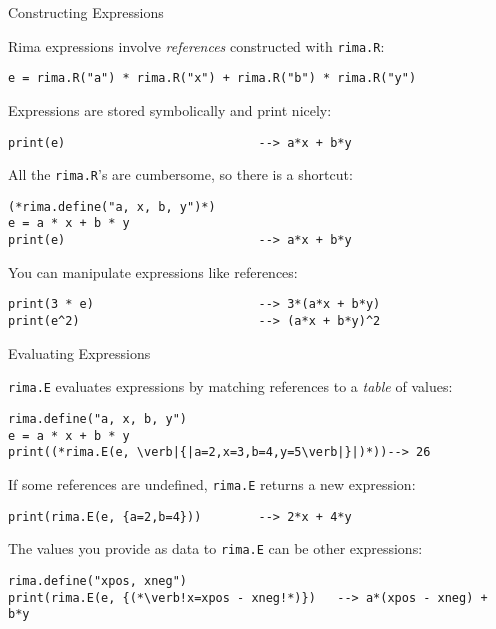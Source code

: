 \documentclass[smaller]{beamer}
\begin{document}
\begin{frame}[fragile]{Constructing Expressions}

  Rima expressions involve \emph{references} constructed with \lstinline!rima.R!:
  \begin{lstlisting}
e = rima.R("a") * rima.R("x") + rima.R("b") * rima.R("y")
  \end{lstlisting}
  \pause

  Expressions are stored symbolically and print nicely:
  \begin{lstlisting}
print(e)                           --> a*x + b*y
  \end{lstlisting}
  \pause
  

  All the \lstinline!rima.R!'s are cumbersome, so there is a shortcut:
  \begin{lstlisting}
(*rima.define("a, x, b, y")*)
e = a * x + b * y
print(e)                           --> a*x + b*y
  \end{lstlisting}
  \pause

  You can manipulate expressions like references:
  \begin{lstlisting}
print(3 * e)                       --> 3*(a*x + b*y)
print(e^2)                         --> (a*x + b*y)^2
  \end{lstlisting}
\end{frame}


\begin{frame}[fragile]{Evaluating Expressions}

  \lstinline!rima.E! evaluates expressions by matching references to a \emph{table} of values:
  \begin{lstlisting}
rima.define("a, x, b, y")
e = a * x + b * y
print((*rima.E(e, \verb|{|a=2,x=3,b=4,y=5\verb|}|)*))--> 26
  \end{lstlisting}
  \pause

  If some references are undefined, \lstinline!rima.E! returns a new expression:
  \begin{lstlisting}
print(rima.E(e, {a=2,b=4}))        --> 2*x + 4*y
  \end{lstlisting}
  \pause

 The values you provide as data to \lstinline!rima.E! can be other expressions:
  \begin{lstlisting}
rima.define("xpos, xneg")
print(rima.E(e, {(*\verb!x=xpos - xneg!*)})   --> a*(xpos - xneg) + b*y
  \end{lstlisting}
\end{frame}
\end{document}
